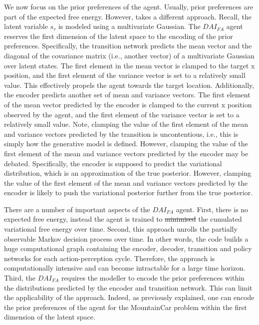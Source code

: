 \documentclass[twoside,11pt]{article}
\providecommand{\DIFadd}[1]{{\protect\color{blue}\uwave{#1}}} %
\providecommand{\DIFdel}[1]{{\protect\color{red}\sout{#1}}}                      %
\providecommand{\DIFaddbegin}{} %
\providecommand{\DIFaddend}{} %
\providecommand{\DIFdelbegin}{} %
\providecommand{\DIFdelend}{} %
\begin{document}
We now focus on the prior preferences of the agent. Usually, prior preferences are part of the expected free energy. However, \citet{DAI_Kai} takes a different approach. Recall, the latent variable $s_\tau$ is modeled using a multivariate Gaussian. The $DAI_{FA}$ agent reserves the first dimension of the latent space to the encoding of the prior preferences. Specifically, the transition network predicts the mean vector and the diagonal of the covariance matrix (i.e., another vector) of a multivariate Gaussian over latent states. The first element in the mean vector is clamped to the target x position, and the first element of the variance vector is set to a relatively small value. This effectively propels the agent towards the target location. Additionally, the encoder predicts another set of mean and variance vectors. The first element of the mean vector predicted by the encoder is clamped to the current x position observed by the agent, and the first element of the variance vector is set to a relatively small value. Note, clamping the value of the first element of the mean and variance vectors predicted by the transition is uncontentious, i.e., this is simply how the generative model is defined. However, clamping the value of the first element of the mean and variance vectors predicted by the encoder may be debated. Specifically, the encoder is supposed to predict the variational distribution, which is an approximation of the true posterior. However, clamping the value of the first element of the mean and variance vectors predicted by the encoder is likely to push the variational posterior further from the true posterior.

There are a number of important aspects of the $DAI_{FA}$ agent. First, there is no expected free energy, instead the agent is trained to \DIFdelbegin \DIFdel{minimised }\DIFdelend \DIFaddbegin \DIFadd{minimise }\DIFaddend the cumulated variational free energy over time. Second, this approach unrolls the partially observable Markov decision process over time. In other words, the code builds a huge computational graph containing the encoder, decoder, transition and policy networks for each action-perception cycle. Therefore, the approach is computationally intensive and can become intractable for a large time horizon. Third, the $DAI_{FA}$ requires the modeller to encode the prior preferences within the distributions predicted by the encoder and transition network. This can limit the applicability of the approach. Indeed, as previously explained, one can encode the prior preferences of the agent for the MountainCar problem within the first dimension of the latent space. 
\end{document}
